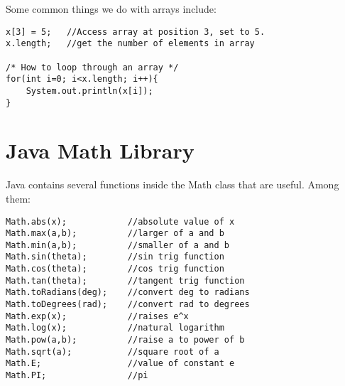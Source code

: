 \documentclass[paper=a4, fontsize=11pt, parskip=full]{scrartcl} %
\numberwithin{equation}{section} %
\numberwithin{figure}{section} %
\numberwithin{table}{section} %
\begin{document}
Some common things we do with arrays include:

\begin{lstlisting}
x[3] = 5;	//Access array at position 3, set to 5.
x.length;	//get the number of elements in array

/* How to loop through an array */
for(int i=0; i<x.length; i++){
	System.out.println(x[i]);
}
\end{lstlisting}

\section{Java Math Library}

Java contains several functions inside the Math class that are useful. Among them:

\begin{lstlisting}
Math.abs(x);			//absolute value of x
Math.max(a,b);			//larger of a and b
Math.min(a,b);			//smaller of a and b
Math.sin(theta);		//sin trig function
Math.cos(theta);		//cos trig function
Math.tan(theta);		//tangent trig function
Math.toRadians(deg);	//convert deg to radians
Math.toDegrees(rad);	//convert rad to degrees
Math.exp(x);			//raises e^x
Math.log(x);			//natural logarithm
Math.pow(a,b);			//raise a to power of b
Math.sqrt(a);			//square root of a
Math.E;					//value of constant e
Math.PI;				//pi
\end{lstlisting}




\end{document}
